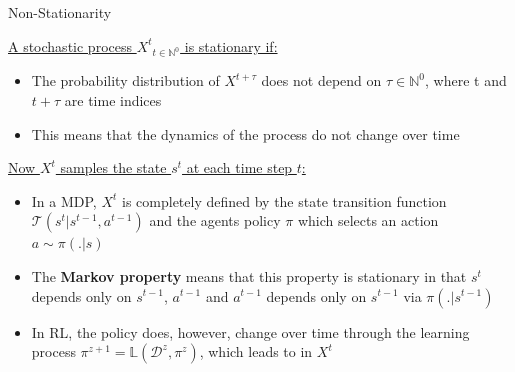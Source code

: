 \begin{frame}{Non-Stationarity}

\underline{A stochastic process ${X^t}_{t \in \mathbb{N}^0}$ is stationary if:}

\begin{itemize}
    \item The probability distribution of $X^{t + \tau}$ does not depend on $\tau \in \mathbb{N}^0$, where t and $t + \tau$ are time indices
    \item This means that the dynamics of the process do not change over time
\end{itemize}

\underline{Now $X^t$ samples the state $s^t$ at each time step $t$:}

\begin{itemize}
    \item In a MDP, $X^t$ is completely defined by the state transition function $\mathcal{T}(s^t|s^{t-1}, a^{t-1})$ and the agents policy $\pi$ which selects an action $a \sim \pi(.|s)$
    \item The \textbf{Markov property} means that this property is stationary in that $s^t$ depends only on $s^{t-1}$, $a^{t-1}$ and $a^{t-1}$ depends only on  $s^{t-1}$ via $\pi(.|s^{t-1})$
    \item In RL, the policy does, however, change over time through the learning process $\pi^{z+1} = \mathbb{L}(\mathcal{D}^z, \pi^z)$,  which leads to  in $X^t$
\end{itemize}

\end{frame}


